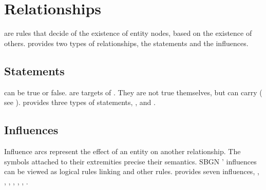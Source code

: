 
\section{Relationships}\label{sec:relationships}

 are rules that decide of the existence of entity nodes, based on the existence of others. 
\SBGNERLone{} provides two types of relationships, the statements and the influences.


\subsection{Statements}\label{sec:statements}

 can be true or false.  are targets of . They are not true themselves, but can  carry ( see ). \SBGNERLone{} provides three types of statements, ,  and .





\subsection{Influences}\label{sec:influences}

Influence arcs represent the effect of an entity on another relationship. The symbols attached to their extremities precise their semantics. SBGN \ERs{}' influences can be viewed as logical rules linking  and other rules. \SBGNERLone{} provides seven influences, , , , , , , .











%

